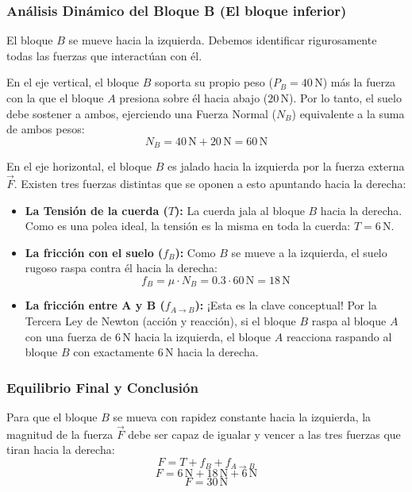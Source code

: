 \documentclass[12pt]{article}
\begin{document}
\subsubsection*{Análisis Dinámico del Bloque B (El bloque inferior)}
El bloque $B$ se mueve hacia la izquierda. Debemos identificar rigurosamente todas las fuerzas que interactúan con él.

En el eje vertical, el bloque $B$ soporta su propio peso ($P_B = 40 \, \text{N}$) más la fuerza con la que el bloque $A$ presiona sobre él hacia abajo ($20 \, \text{N}$). Por lo tanto, el suelo debe sostener a ambos, ejerciendo una Fuerza Normal ($N_B$) equivalente a la suma de ambos pesos:
\begin{equation}
    N_B = 40 \, \text{N} + 20 \, \text{N} = 60 \, \text{N}
\end{equation}

En el eje horizontal, el bloque $B$ es jalado hacia la izquierda por la fuerza externa $\vec{F}$. Existen tres fuerzas distintas que se oponen a esto apuntando hacia la derecha:
\begin{itemize}
    \item \textbf{La Tensión de la cuerda ($T$):} La cuerda jala al bloque $B$ hacia la derecha. Como es una polea ideal, la tensión es la misma en toda la cuerda: $T = 6 \, \text{N}$.
    \item \textbf{La fricción con el suelo ($f_B$):} Como $B$ se mueve a la izquierda, el suelo rugoso raspa contra él hacia la derecha:
    \begin{equation}
        f_B = \mu \cdot N_B = 0.3 \cdot 60 \, \text{N} = 18 \, \text{N}
    \end{equation}
    \item \textbf{La fricción entre A y B ($f_{A \to B}$):} ¡Esta es la clave conceptual! Por la Tercera Ley de Newton (acción y reacción), si el bloque $B$ raspa al bloque $A$ con una fuerza de $6 \, \text{N}$ hacia la izquierda, el bloque $A$ reacciona raspando al bloque $B$ con exactamente $6 \, \text{N}$ hacia la derecha.
\end{itemize}

\subsubsection*{Equilibrio Final y Conclusión}
Para que el bloque $B$ se mueva con rapidez constante hacia la izquierda, la magnitud de la fuerza $\vec{F}$ debe ser capaz de igualar y vencer a las tres fuerzas que tiran hacia la derecha:
\begin{equation}
    F = T + f_B + f_{A \to B}
\end{equation}
\begin{equation}
    F = 6 \, \text{N} + 18 \, \text{N} + 6 \, \text{N}
\end{equation}
\begin{equation}
    F = 30 \, \text{N}
\end{equation}
\end{document}
